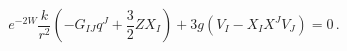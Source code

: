 \begin{equation}
e^{-2W} \frac{k}{r^2}(-G_{IJ}q^J + \frac 32 Z X_I) + 3g (V_I - X_I X^J V_J) = 0\,.
\end{equation}


